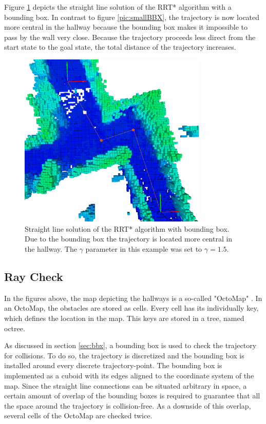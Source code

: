 Figure \ref{pic:bbx} depicts the straight line solution of the RRT* algorithm with a bounding box. In contrast to figure \ref{pic:smallBBX}, the trajectory is now located more central in the hallway because the bounding box makes it impossible to pass by the wall very close. Because the trajectory proceeds less direct from the start state to the goal state, the total distance of the trajectory increases. 

\begin{figure}[H]
   \centering
   \includegraphics[trim = 50mm 0mm 30mm 0mm,clip,width=0.8\textwidth]{pics/largeBBXP.png}
   \caption{Straight line solution of the RRT* algorithm with bounding box. Due to the bounding box the trajectory is located more central in the hallway. The $\gamma$ parameter in this example was set to $\gamma = 1.5$.}
   \label{pic:bbx}
\end{figure}

\subsection{Ray Check}\label{sec:RayCheck}

In the figures above, the map depicting the hallways is a so-called "OctoMap" \cite{OctoMap}. In an OctoMap, the obstacles are stored as cells. Every cell has its individually key, which defines the location in the map. This keys are stored in a tree, named octree.\newline

As discussed in section \ref{sec:bbx}, a bounding box is used to check the trajectory for collisions. To do so, the trajectory is discretized and the bounding box is installed around every discrete trajectory-point. The bounding box is implemented as a cuboid with its edges aligned to the coordinate system of the map. Since the straight line connections can be situated arbitrary in space, a certain amount of overlap of the bounding boxes is required to guarantee that all the space around the trajectory is collision-free. As a downside of this overlap, several cells of the OctoMap are checked twice.\newline

